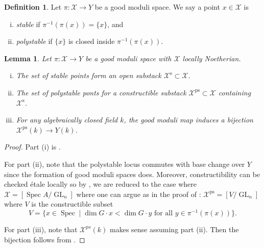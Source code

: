 \documentclass{amsart}
\newtheorem{lemma}[lemma]{Lemma}
\theoremstyle{definition}
\newtheorem{definition}[definition]{Definition}
\newcommand{\cX}{\mathcal{X}}
\DeclareMathOperator{\ps}{ps}
\DeclareMathOperator{\s}{s}
\DeclareMathOperator{\GL}{GL}
\DeclareMathOperator{\Spec}{Spec}
\begin{document}
	\begin{definition}\label{def:ps}
		Let $\pi \colon \cX \to Y$ be a good moduli space. We say a point $x \in \cX$ is
		\begin{enumerate}[(i)]
			\item \emph{stable} if $\pi^{-1}(\pi(x)) = \{x\}$, and
			\item \emph{polystable} if $\{x\}$ is closed inside $\pi^{-1}(\pi(x))$. 
		\end{enumerate}
	\end{definition}
	
	\begin{lemma}\label{lem:ps} Let $\pi \colon \cX \to Y$ be a good moduli space with $\cX$ locally Noetherian. 
		\begin{enumerate}[(i)]
			\item The set of stable points form an open substack $\cX^{\s} \subset \cX$. 
			\item The set of polystable ponts for a constructible substack $\cX^{\ps} \subset \cX$ containing $\cX^{\s}$. 
			\item For any algebraically closed field $k$, the good moduli map induces a bijection $\cX^{\ps}(k) \to Y(k)$. 
		\end{enumerate}
	\end{lemma}
	\begin{proof} Part (i) is \cite[Proposition 2.6]{ER}.
		
		For part (ii), note that the polystable locus commutes with base change over $Y$ since the formation of good moduli spaces does. Moreover, constructibility can be checked \'etale locally so by \cite[Theorem 6.1]{AHRetalelocal}, we are reduced to the case where $\cX = [\Spec A/\GL_n]$ where one can argue as in the proof of \cite[Theorem 7.8]{xuzhuang}: $\cX^{\ps} = [V/\GL_n]$ where $V$ is the constructible subset
		$$
		V = \{x \in \Spec \mid \dim G \cdot x < \dim G \cdot y \text{ for all } y \in \pi^{-1}(\pi(x))\}. 
		$$
		
		For part (iii), note that $\cX^{ps}(k)$ makes sense assuming part (ii). Then the bijection follows from \cite[Theorem 4.16(iv) \& Proposition 9.1]{Alper}.  
		
	\end{proof} 
	
	
	
\end{document}
